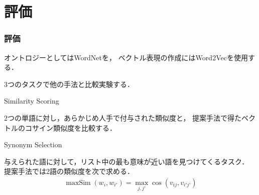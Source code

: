 \documentclass[10pt,hyperref={unicode}]{beamer}
\DeclareMathOperator*{\maxSim}{maxSim}
\newenvironment{wideenumerate}{\enumerate\addtolength{\itemsep}{1em}}{\endenumerate}
\newcommand{\parentheses}[1]{\left(#1\right)}
\begin{document}
\section{評価}
\begin{frame}
\frametitle{評価}
オントロジーとしてはWordNetを，
ベクトル表現の作成にはWord2Vecを使用する．

\bigskip

3つのタスクで他の手法と比較実験する．

\bigskip

\begin{wideenumerate}
    \item Similarity Scoring

        2つの単語に対し，あらかじめ人手で付与された類似度と，
        提案手法で得たベクトルのコサイン類似度を比較する．

    \item Synonym Selection

        与えられた語に対して，リスト中の最も意味が近い語を見つけてくるタスク．
        提案手法では2語の類似度を次で求める．
        \begin{align}
            \maxSim \parentheses{w_i,w_{i'}} = \max_{j,j'} \cos \parentheses{v_{ij}, v_{i'j'}}
        \tag{9}
        \end{align}
\end{wideenumerate}
\end{frame}
\end{document}

